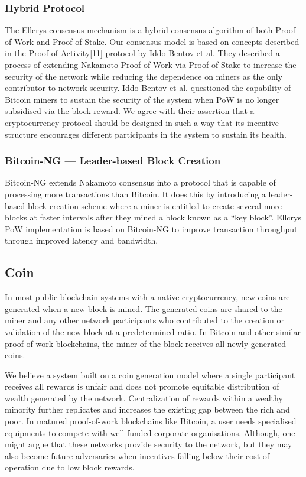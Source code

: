\subsubsection{Hybrid Protocol}
The Ellcrys consensus mechanism is a hybrid consensus algorithm of both Proof-of-Work and Proof-of-Stake. Our consensus model is based on concepts described in the Proof of Activity[11] protocol by Iddo Bentov et al. They described a process of extending Nakamoto Proof of Work via Proof of Stake to increase the security of the network while reducing the dependence on miners as the only contributor to network security. Iddo Bentov et al. questioned the capability of Bitcoin miners to sustain the security of the system when PoW is no longer subsidised via the block reward. We agree with their assertion that a cryptocurrency protocol should be designed in such a way that its incentive structure encourages different participants in the system to sustain its health.

\subsubsection{Bitcoin-NG — Leader-based Block Creation}
Bitcoin-NG extends Nakamoto consensus into a protocol that is capable of processing more transactions than Bitcoin. It does this by introducing a leader-based block creation scheme where a miner is entitled to create several more blocks at faster intervals after they mined a block known as a “key block”. Ellcrys PoW implementation is based on Bitcoin-NG to improve transaction throughput through improved latency and bandwidth.


\subsection{Coin}
In most public blockchain systems with a native cryptocurrency, new coins are generated when a new block is mined. The generated coins are shared to the miner and any other network participants who contributed to the creation or validation of the new block at a predetermined ratio. In Bitcoin and other similar proof-of-work blockchains, the miner of the block receives all newly generated coins.

We believe a system built on a coin generation model where a single participant receives all rewards is unfair and does not promote equitable distribution of wealth generated by the network. Centralization of rewards within a wealthy minority further replicates and increases the existing gap between the rich and poor. In matured proof-of-work blockchains like Bitcoin, a user needs specialised equipments to compete with well-funded corporate organisations. Although, one might argue that these networks provide security to the network, but they may also become future adversaries when incentives falling below their cost of operation due to low block rewards.

